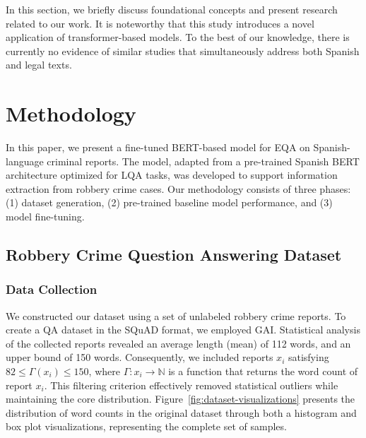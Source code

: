 \documentclass[runningheads]{llncs}
\begin{document}
In this section, we briefly discuss foundational concepts and present
research related to our work. It is noteworthy that this study
introduces a novel application of transformer-based models. To the
best of our knowledge, there is currently no evidence of similar
studies that simultaneously address both Spanish and legal texts.
\section{Methodology}
\label{sec:methodology}
In this paper, we present a fine-tuned BERT-based model for EQA on
Spanish-language criminal reports. The model, adapted from a
pre-trained Spanish BERT architecture optimized for LQA tasks, was
developed to support information extraction from robbery crime
cases. Our methodology consists of three phases: (1) dataset
generation, (2) pre-trained baseline model performance, and (3) model
fine-tuning.

\subsection{Robbery Crime Question Answering Dataset}
\label{sec:robb-crime-quest}

\subsubsection{Data Collection}
\label{sec:data-collection}
We constructed our dataset using a set of unlabeled robbery crime
reports. To create a QA dataset in the SQuAD format, we employed
GAI. Statistical analysis of the collected reports revealed an average
length (mean) of 112 words, and an upper bound of 150
words. Consequently, we included reports $x_i$ satisfying
$82 \leq \Gamma(x_i) \leq 150$, where
$\Gamma: x_i \rightarrow \mathbb{N}$ is a function that returns the
word count of report $x_i$. This filtering criterion effectively
removed statistical outliers while maintaining the core
distribution. Figure~\ref{fig:dataset-visualizations} presents the
distribution of word counts in the original dataset through both a
histogram and box plot visualizations, representing the complete set
of  samples.
\end{document}
